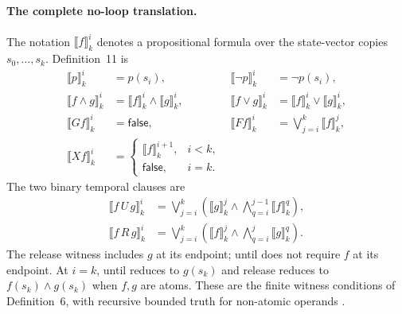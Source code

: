 \paragraph{The complete no-loop translation.}
The notation \(\llbracket f\rrbracket_k^i\) denotes a propositional formula
over the state-vector copies \(s_0,\ldots,s_k\). Definition~11 is
\[
\begin{aligned}
 \llbracket p\rrbracket_k^i&=p(s_i),&
 \llbracket\neg p\rrbracket_k^i&=\neg p(s_i),\\
 \llbracket f\land g\rrbracket_k^i
   &=\llbracket f\rrbracket_k^i\land\llbracket g\rrbracket_k^i,&
 \llbracket f\lor g\rrbracket_k^i
   &=\llbracket f\rrbracket_k^i\lor\llbracket g\rrbracket_k^i,\\
 \llbracket Gf\rrbracket_k^i&=\mathsf{false},&
 \llbracket Ff\rrbracket_k^i&=\bigvee_{j=i}^{k}\llbracket f\rrbracket_k^j,\\
 \llbracket Xf\rrbracket_k^i
   &=\begin{cases}
        \llbracket f\rrbracket_k^{i+1},&i<k,\\
        \mathsf{false},&i=k.
      \end{cases}
\end{aligned}
\]
The two binary temporal clauses are
\[
\begin{aligned}
 \llbracket f\,U\,g\rrbracket_k^i
 &=\bigvee_{j=i}^{k}
      \left(\llbracket g\rrbracket_k^j\land
            \bigwedge_{q=i}^{j-1}\llbracket f\rrbracket_k^q\right),\\
 \llbracket f\,R\,g\rrbracket_k^i
 &=\bigvee_{j=i}^{k}
      \left(\llbracket f\rrbracket_k^j\land
            \bigwedge_{q=i}^{j}\llbracket g\rrbracket_k^q\right).
\end{aligned}
\]
The release witness includes \(g\) at its endpoint; until does not require
\(f\) at its endpoint. At \(i=k\), until reduces to \(g(s_k)\) and release
reduces to \(f(s_k)\land g(s_k)\) when \(f,g\) are atoms. These are the finite
witness conditions of Definition~6, with recursive bounded truth for
non-atomic operands \cite[defs.~6, 11]{BiereCimattiClarkeZhu1999}.

